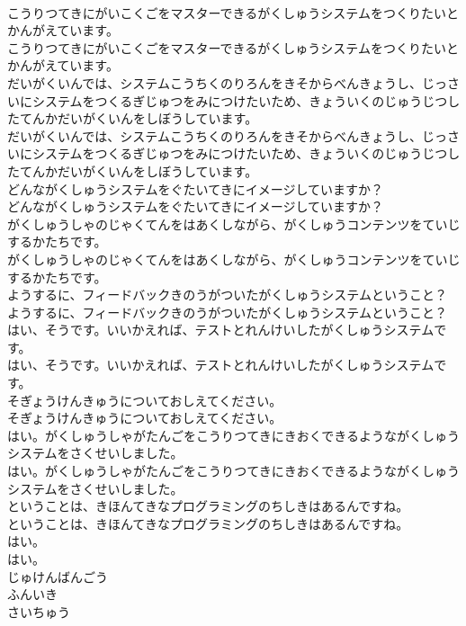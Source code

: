 \documentclass[8pt]{extreport}
\begin{document}
\begin{CJK}{UTF8}{min}
\\	こうりつてきにがいこくごをマスターできるがくしゅうシステムをつくりたいとかんがえています。	
\\	こうりつてきにがいこくごをマスターできるがくしゅうシステムをつくりたいとかんがえています。 
\\	だいがくいんでは、システムこうちくのりろんをきそからべんきょうし、じっさいにシステムをつくるぎじゅつをみにつけたいため、きょういくのじゅうじつしたてんかだいがくいんをしぼうしています。	
\\	だいがくいんでは、システムこうちくのりろんをきそからべんきょうし、じっさいにシステムをつくるぎじゅつをみにつけたいため、きょういくのじゅうじつしたてんかだいがくいんをしぼうしています。 
\\	どんながくしゅうシステムをぐたいてきにイメージしていますか？	
\\	どんながくしゅうシステムをぐたいてきにイメージしていますか？ 
\\	がくしゅうしゃのじゃくてんをはあくしながら、がくしゅうコンテンツをていじするかたちです。	
\\	がくしゅうしゃのじゃくてんをはあくしながら、がくしゅうコンテンツをていじするかたちです。 
\\	ようするに、フィードバックきのうがついたがくしゅうシステムということ？	
\\	ようするに、フィードバックきのうがついたがくしゅうシステムということ？ 
\\	はい、そうです。いいかえれば、テストとれんけいしたがくしゅうシステムです。	
\\	はい、そうです。いいかえれば、テストとれんけいしたがくしゅうシステムです。 
\\	そぎょうけんきゅうについておしえてください。	
\\	そぎょうけんきゅうについておしえてください。 
\\	はい。がくしゅうしゃがたんごをこうりつてきにきおくできるようながくしゅうシステムをさくせいしました。	
\\	はい。がくしゅうしゃがたんごをこうりつてきにきおくできるようながくしゅうシステムをさくせいしました。 
\\	ということは、きほんてきなプログラミングのちしきはあるんですね。	
\\	ということは、きほんてきなプログラミングのちしきはあるんですね。 
\\	はい。	
\\	はい。 
\\	じゅけんばんごう
\\	ふんいき
\\	さいちゅう

\end{CJK}
\end{document}
